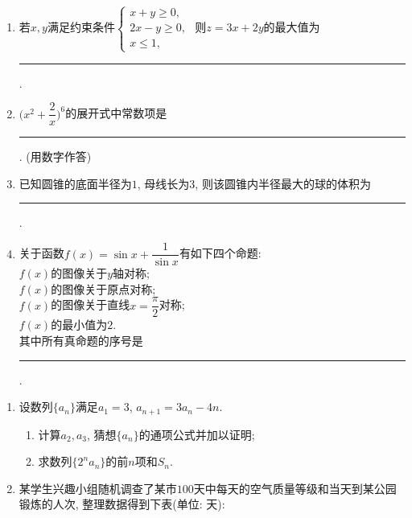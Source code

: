 \begin{description}
\begin{enumerate}[leftmargin=5pt]
    \end{enumerate}
    
    \item[二、填空题]
    \begin{enumerate}[leftmargin=5pt]
      \addtocounter{enumi}{+12}
        \item 若$x,y$满足约束条件$\begin{cases}x+y\geqslant 0,\\2x-y\geqslant 0,\\x\leqslant 1,\end{cases}$ 则$z=3x+2y$的最大值为 \rule[-0.3ex]{3em}{0.4pt}.
        \item $\bigl(x^{2}+\dfrac{2}{x}\bigr)^{6}$的展开式中常数项是 \rule[-0.3ex]{3em}{0.4pt}. (用数字作答)
        \item 已知圆锥的底面半径为$1$, 母线长为$3$, 则该圆锥内半径最大的球的体积为 \rule[-0.3ex]{3em}{0.4pt}.
        \item 关于函数$f(x)=\sin x+\dfrac{1}{\sin x}$有如下四个命题:\\
         $f(x)$的图像关于$y$轴对称;\\
         $f(x)$的图像关于原点对称;\\
         $f(x)$的图像关于直线$x=\dfrac{\pi}{2}$对称;\\
         $f(x)$的最小值为$2$.\\
        其中所有真命题的序号是 \rule[-0.3ex]{3em}{0.4pt}.
    \end{enumerate}
    
    \item[三、解答题]
    \begin{enumerate}[leftmargin=5pt]
      \addtocounter{enumi}{+16}
        \item 设数列$\{a_n\}$满足$a_1=3$, $a_{n+1}=3a_n-4n$.
        \begin{enumerate}[label=(\arabic*)]
            \item 计算$a_2,a_3$, 猜想$\{a_n\}$的通项公式并加以证明;
            \item 求数列$\{2^{n}a_n\}$的前$n$项和$S_n$.
        \end{enumerate}

        \item 某学生兴趣小组随机调查了某市$100$天中每天的空气质量等级和当天到某公园锻炼的人次, 整理数据得到下表(单位: 天):
        

\end{enumerate}
\end{description}
